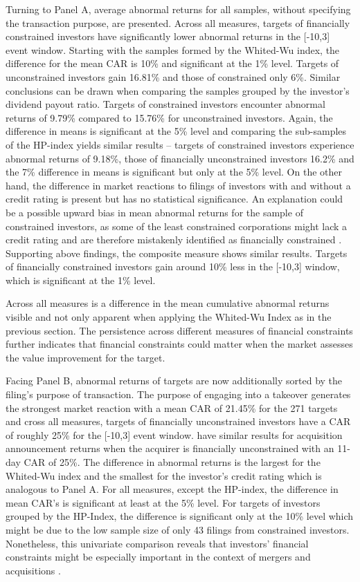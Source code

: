 \documentclass[12pt]{article}
\begin{document}
Turning to Panel A, average abnormal returns for all samples, without specifying the transaction purpose, are presented. Across all measures, targets of financially constrained investors have significantly lower abnormal returns in the [-10,3] event window. Starting with the samples formed by the Whited-Wu index, the difference for the mean CAR is 10\% and significant at the 1\% level. Targets of unconstrained investors gain 16.81\% and those of constrained only 6\%. Similar conclusions can be drawn when comparing the samples grouped by the investor's dividend payout ratio. Targets of constrained investors encounter abnormal returns of 9.79\% compared to 15.76\% for unconstrained investors. Again, the difference in means is significant at the 5\% level and comparing the sub-samples of the HP-index yields similar results -- targets of constrained investors experience abnormal returns of 9.18\%, those of financially unconstrained investors 16.2\% and the 7\% difference in means is significant but only at the 5\% level. On the other hand, the difference in market reactions to filings of investors with and without a credit rating is present but has no statistical significance. An explanation could be a possible upward bias in mean abnormal returns for the sample of constrained investors, as some of the least constrained corporations might lack a credit rating and are therefore mistakenly identified as financially constrained \citep[p.18]{heller2015}. Supporting above findings, the composite measure shows similar results. Targets of financially constrained investors gain around 10\% less in the [-10,3] window, which is significant at the 1\% level.\par
Across all measures is a difference in the mean cumulative abnormal returns visible and not only apparent when applying the Whited-Wu Index as in the previous section. The persistence across different measures of financial constraints further indicates that financial constraints could matter when the market assesses the value improvement for the target.\par
Facing Panel B, abnormal returns of targets are now additionally sorted by the filing's purpose of transaction. The purpose of engaging into a takeover generates the strongest market reaction with a mean CAR of 21.45\% for the 271 targets and cross all measures, targets of financially unconstrained investors have a CAR of roughly 25\% for the [-10,3] event window. \citet[p.112]{Khatami2014} have similar results for acquisition announcement returns when the acquirer is financially unconstrained with an 11-day CAR of 25\%. The difference in abnormal returns is the largest for the Whited-Wu index and the smallest for the investor's credit rating which is analogous to Panel A. For all measures, except the HP-index, the difference in mean CAR's is significant at least at the 5\% level. For targets of investors grouped by the HP-Index, the difference is significant only at the 10\% level which might be due to the low sample size of only 43 filings from constrained investors. Nonetheless, this univariate comparison reveals that investors' financial constraints might be especially important in the context of mergers and acquisitions \citep[p.112]{Khatami2014}.
\end{document}
